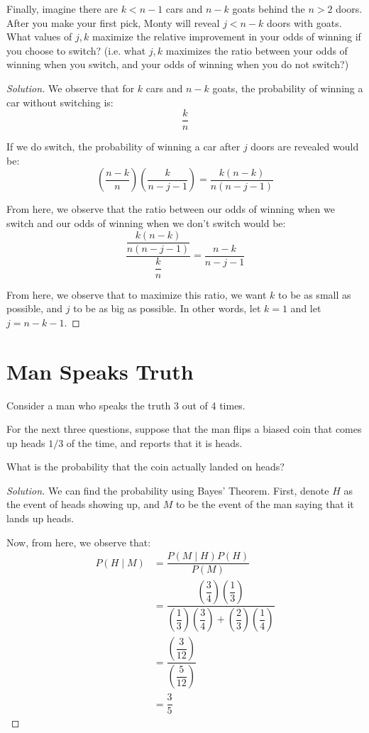 \documentclass{article}
\newenvironment{solution}{\begin{proof}[Solution]}{\end{proof}}
\begin{document}
\begin{hw}
	Finally, imagine there are $k<n-1$ cars and $n-k$ goats behind the
	$n>2$ doors. After you make your first pick, Monty will reveal $j<n-k$
	doors with goats. What values of $j, k$ maximize the relative
	improvement in your odds of winning if you choose to switch? (i.e. what
	$j, k$ maximizes the ratio between your odds of winning when you switch, and your odds of winning when you do not switch?)
\end{hw}
\begin{solution}
	We observe that for $k$ cars and $n-k$ goats, the probability of winning a car without switching is:
	\begin{equation*}
		\dfrac{k}{n}
	\end{equation*}

	If we do switch, the probability of winning a car after $j$ doors are revealed would be:
	\begin{equation*}
		\left( \dfrac{n-k}{n} \right)\left( \dfrac{k}{n-j-1} \right) = \dfrac{k(n-k)}{n(n-j-1)}
	\end{equation*}

	From here, we observe that the ratio between our odds of winning when we switch and our odds of winning when we don't switch would be:
	\begin{equation*}
		\dfrac{\dfrac{k(n-k)}{n(n-j-1)}}{\dfrac{k}{n}} = \dfrac{n-k}{n-j-1}
	\end{equation*}

	From here, we observe that to maximize this ratio, we want $k$ to be as small as possible, and $j$ to be as big as possible. In other words, let $k = 1$ and let $j = n-k-1$.
\end{solution}

\newpage

\section{Man Speaks Truth}
Consider a man who speaks the truth 3 out of 4 times.

For the next three questions, suppose that the man flips a biased coin that comes up heads $1/3$ of the time, and reports that it is heads. 
\begin{hw}
	What is the probability that the coin actually landed on heads?
\end{hw}
\begin{solution}
	We can find the probability using Bayes' Theorem. First, denote $H$ as the event of heads showing up, and $M$ to be the event of the man saying that it lands up heads.
	
	Now, from here, we observe that:
	\begin{align*}
		P(H \mid M) &= \dfrac{P(M \mid H)P(H)}{P(M)} \\
		&= \dfrac{\left( \dfrac{3}{4} \right)\left( \dfrac{1}{3} \right)}{\left( \dfrac{1}{3} \right)\left( \dfrac{3}{4} \right) + \left( \dfrac{2}{3} \right)\left( \dfrac{1}{4} \right)} \\
		&= \dfrac{\left( \dfrac{3}{12} \right)}{\left( \dfrac{5}{12} \right)} \\
		&= \dfrac{3}{5}
	\end{align*}
\end{solution}
\end{document}
